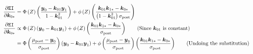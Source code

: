 \documentclass[11pt]{article}
\numberwithin{figure}{section}
\numberwithin{equation}{section}
\def\EI{\texttt{EI}}
\newcommand{\bs}[1]{\boldsymbol{#1}}
\def\bsy{\bs{y}}
\def\bsk{\bs{k}}
\begin{document}
{\begin{align*}
\frac{\partial \EI}{\partial \bsk_{0*}} &= \Phi\left(Z\right)\left(\frac{\bsy_{0} - \bsk_{01}\bsy_{1}}{1 - \bsk_{01}^2}\right) + \phi\left(Z\right)\left(\frac{\bsk_{01}\bsk_{1*} - \bsk_{0*}}{\left(1 - \bsk_{01}^{2}\right)\sigma_{\textrm{post}}}\right)\\
\frac{\partial \EI}{\partial \bsk_{0*}} &\propto \Phi\left(Z\right)\left(\bsy_{0} - \bsk_{01}\bsy_{1}\right) + \phi\left(Z\right)\left(\frac{\bsk_{01}\bsk_{1*} - \bsk_{0*}}{\sigma_{\textrm{post}}}\right)\tag{Since $\bsk_{01}$ is constant}\\
&= \Phi\left(\frac{\mu_{\textrm{post}} - \bsy_{0}}{\sigma_{\textrm{post}}}\right)\left(\bsy_{0} - \bsk_{01}\bsy_{1}\right) + \phi\left(\frac{\mu_{\textrm{post}} - \bsy_{0}}{\sigma_{\textrm{post}}}\right)\left(\frac{\bsk_{01}\bsk_{1*} - \bsk_{0*}}{\sigma_{\textrm{post}}}\right)\tag{Undoing the substitution}\\
\end{align*}
}%
\vfill{}
\end{document}
